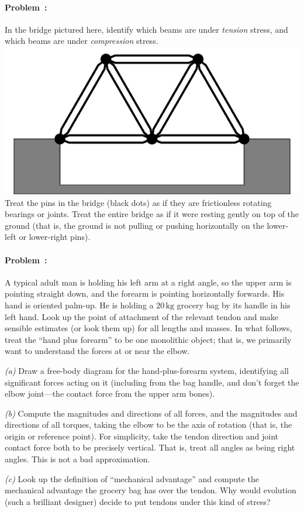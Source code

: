 \documentclass[12pt]{article}
\newcommand{\kg}{\mathrm{kg}}
\newcounter{problem}
\begin{document}
\paragraph{Problem~\theproblem:}%
In the bridge pictured here, identify which beams are under
\emph{tension} stress, and which beams are under \emph{compression}
stress.\\\includegraphics{../py/bridge.pdf}\\ Treat the pins in the
bridge (black dots) as if they are frictionless rotating bearings or
joints.  Treat the entire bridge as if it were resting gently on top
of the ground (that is, the ground is not pulling or pushing
horizontally on the lower-left or lower-right pins).

\paragraph{Problem~\theproblem:}%
A typical adult man is holding his left arm at a right angle, so the
upper arm is pointing straight down, and the forearm is pointing
horizontally forwards.  His hand is oriented palm-up.  He is holding a
$20\,\kg$ grocery bag by its handle in his left hand.  Look up the
point of attachment of the relevant tendon and make sensible estimates
(or look them up) for all lengths and masses.  In what follows, treat
the ``hand plus forearm'' to be one monolithic object; that is, we
primarily want to understand the forces at or near the elbow.

\textsl{(a)} Draw a free-body diagram for the hand-plus-forearm
system, identifying all significant forces acting on it (including
from the bag handle, and don't forget the elbow joint---the contact
force from the upper arm bones).

\textsl{(b)} Compute the magnitudes and directions of all forces, and
the magnitudes and directions of all torques, taking the elbow to be
the axis of rotation (that is, the origin or reference point).  For
simplicity, take the tendon direction and joint contact force both to
be precisely vertical.  That is, treat all angles as being right
angles.  This is not a bad approximation.

\textsl{(c)} Look up the definition of ``mechanical advantage'' and
compute the mechanical advantage the grocery bag has over the tendon.
Why would evolution (such a brilliant designer) decide to put tendons
under this kind of stress?
\end{document}
